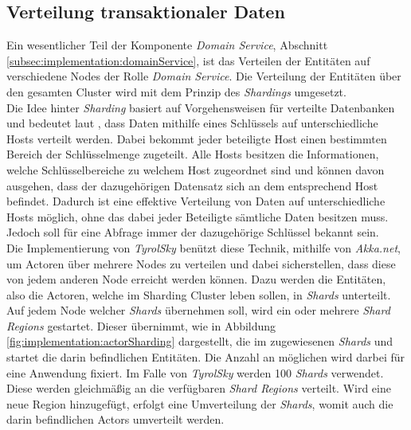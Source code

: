 \subsection{Verteilung transaktionaler Daten}
\label{subsec:implementation:akkaSharding}
Ein wesentlicher Teil der Komponente \textit{Domain Service}, Abschnitt \ref{subsec:implementation:domainService}, ist das Verteilen der Entitäten auf verschiedene Nodes der Rolle \textit{Domain Service}. Die Verteilung der Entitäten über den gesamten Cluster wird mit dem Prinzip des \textit{Shardings} umgesetzt. \\
Die Idee hinter \textit{Sharding} basiert auf Vorgehensweisen für verteilte Datenbanken und bedeutet laut \cite{shardingCattell}, dass Daten mithilfe eines Schlüssels auf unterschiedliche Hosts verteilt werden. Dabei bekommt jeder beteiligte Host einen bestimmten Bereich der Schlüsselmenge zugeteilt. Alle Hosts besitzen die Informationen, welche Schlüsselbereiche zu welchem Host zugeordnet sind und können davon ausgehen, dass der dazugehörigen Datensatz sich an dem entsprechend Host befindet. Dadurch ist eine effektive Verteilung von Daten auf unterschiedliche Hosts möglich, ohne das dabei jeder Beteiligte sämtliche Daten besitzen muss. Jedoch soll für eine Abfrage immer der dazugehörige Schlüssel bekannt sein. \\
% 
% 
Die Implementierung von \textit{TyrolSky} benützt diese Technik, mithilfe von \textit{Akka.net}, um Actoren über mehrere Nodes zu verteilen und dabei sicherstellen, dass diese von jedem anderen Node erreicht werden können. Dazu werden die Entitäten, also die Actoren, welche im Sharding Cluster leben sollen, in \textit{Shards} unterteilt. Auf jedem Node welcher \textit{Shards} übernehmen soll, wird ein oder mehrere  \textit{Shard Regions} gestartet. Dieser übernimmt, wie in Abbildung \ref{fig:implementation:actorSharding} dargestellt, die im zugewiesenen \textit{Shards} und startet die darin befindlichen Entitäten. Die Anzahl an möglichen  wird darbei für eine Anwendung fixiert. Im Falle von \textit{TyrolSky} werden {100} \textit{Shards} verwendet. Diese werden gleichmäßig an die verfügbaren \textit{Shard Regions} verteilt. Wird eine neue Region hinzugefügt, erfolgt eine Umverteilung der \textit{Shards}, womit auch die darin befindlichen Actors umverteilt werden. 
% 
% 

